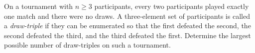 On a tournament with $ n \ge 3$ participants, every two participants played exactly one match and there were no draws. A three-element set of participants is called a \textit{draw-triple} if they can be enumerated so that the ﬁrst defeated the second, the second defeated the third, and the third defeated the ﬁrst. Determine the largest possible number of draw-triples on such a tournament.